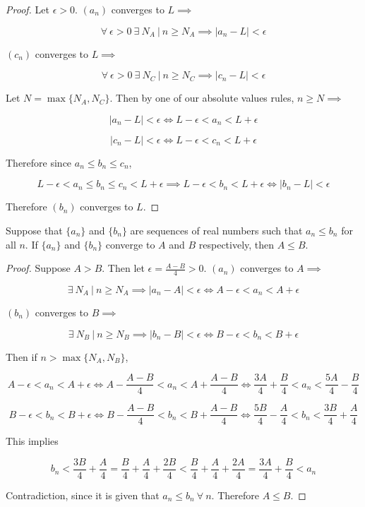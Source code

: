 \begin{proof} Let \(\epsilon >0\). \((a_n)\) converges to \(L \implies\)

\[
\forall \ \epsilon> 0 \ \exists \ N_A \ | \ n \geq N_A \implies | a_n - L | < \epsilon 
\]

\((c_n)\) converges to \(L \implies\)

\[
\forall \ \epsilon> 0 \ \exists \ N_C \ | \ n \geq N_C \implies | c_n - L | < \epsilon 
\]

Let \(N = \max \{N_A, N_C\} \). Then by one of our absolute values rules, \(n \geq N \implies\)

\[
| a_n - L | < \epsilon \iff L - \epsilon < a_n < L + \epsilon
\]

\[
| c_n - L | < \epsilon \iff L - \epsilon < c_n < L + \epsilon
\]

Therefore since \(a_n \leq b_n \leq c_n\),

\[
 L - \epsilon < a_n \leq b_n \leq c_n < L + \epsilon \implies L - \epsilon < b_n < L + \epsilon \iff | b_n - L | < \epsilon
\]

Therefore \((b_n)\) converges to \(L\).

\end{proof}

\begin{theorem} Suppose that \(\{a_n\}\) and \(\{b_n\}\) are sequences of real numbers such that \(a_n \leq b_n\) for all \(n\). If \(\{a_n\}\) and \(\{b_n\}\) converge to \(A\) and \(B\) respectively, then \(A \leq B\).

\end{theorem}

\begin{proof} Suppose \(A > B\). Then let \(\epsilon = \frac{A - B}{4} > 0\). \((a_n)\) converges to \(A \implies\)

\[
\exists \ N_A \ | \ n \geq N_A \implies | a_n - A | < \epsilon \iff A - \epsilon < a_n < A + \epsilon
\]

\((b_n)\) converges to \(B \implies\)

\[
\exists \ N_B \ | \ n \geq N_B \implies | b_n - B | < \epsilon \iff B - \epsilon < b_n < B + \epsilon
\]

Then if \(n > \max \{ N_A, N_B\} \),

\[
A - \epsilon < a_n < A + \epsilon \iff A - \frac{A - B}{4} < a_n < A +\frac{A - B}{4} \iff \frac{3A}{4} + \frac{B}{4} < a_n <  \frac{5A}{4} - \frac{B}{4}
\]

\[
B - \epsilon < b_n < B + \epsilon \iff B -\frac{A - B}{4}< b_n < B+ \frac{A - B}{4} \iff \frac{5B}{4} - \frac{A}{4} < b_n <  \frac{3B}{4} + \frac{A}{4}
\]

This implies

\[
 b_n <  \frac{3B}{4} + \frac{A}{4} = \frac{B}{4} + \frac{A}{4} + \frac{2B}{4} < \frac{B}{4} + \frac{A}{4} + \frac{2A}{4}  = \frac{3A}{4} + \frac{B}{4} < a_n
\]

Contradiction, since it is given that \(a_n \leq b_n \ \forall \ n\). Therefore \(A \leq B\).
\end{proof}

